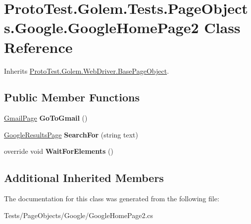 \hypertarget{class_proto_test_1_1_golem_1_1_tests_1_1_page_objects_1_1_google_1_1_google_home_page2}{\section{Proto\-Test.\-Golem.\-Tests.\-Page\-Objects.\-Google.\-Google\-Home\-Page2 Class Reference}
\label{class_proto_test_1_1_golem_1_1_tests_1_1_page_objects_1_1_google_1_1_google_home_page2}
}


Inherits \hyperlink{class_proto_test_1_1_golem_1_1_web_driver_1_1_base_page_object}{Proto\-Test.\-Golem.\-Web\-Driver.\-Base\-Page\-Object}.

\subsection*{Public Member Functions}
\begin{DoxyCompactItemize}
\item 
\hypertarget{class_proto_test_1_1_golem_1_1_tests_1_1_page_objects_1_1_google_1_1_google_home_page2_a10a8f3facb80891a722764e8daddb1f4}{\hyperlink{class_proto_test_1_1_golem_1_1_tests_1_1_page_objects_1_1_google_1_1_gmail_page}{Gmail\-Page} {\bfseries Go\-To\-Gmail} ()}\label{class_proto_test_1_1_golem_1_1_tests_1_1_page_objects_1_1_google_1_1_google_home_page2_a10a8f3facb80891a722764e8daddb1f4}

\item 
\hypertarget{class_proto_test_1_1_golem_1_1_tests_1_1_page_objects_1_1_google_1_1_google_home_page2_a1d4457dedbf37c6c3ea99cd3bab8d166}{\hyperlink{class_proto_test_1_1_golem_1_1_tests_1_1_page_objects_1_1_google_1_1_google_results_page}{Google\-Results\-Page} {\bfseries Search\-For} (string text)}\label{class_proto_test_1_1_golem_1_1_tests_1_1_page_objects_1_1_google_1_1_google_home_page2_a1d4457dedbf37c6c3ea99cd3bab8d166}

\item 
\hypertarget{class_proto_test_1_1_golem_1_1_tests_1_1_page_objects_1_1_google_1_1_google_home_page2_afd6db243612e100e04cc13993e8759ed}{override void {\bfseries Wait\-For\-Elements} ()}\label{class_proto_test_1_1_golem_1_1_tests_1_1_page_objects_1_1_google_1_1_google_home_page2_afd6db243612e100e04cc13993e8759ed}

\end{DoxyCompactItemize}
\subsection*{Additional Inherited Members}


The documentation for this class was generated from the following file\-:\begin{DoxyCompactItemize}
\item 
Tests/\-Page\-Objects/\-Google/Google\-Home\-Page2.\-cs\end{DoxyCompactItemize}
